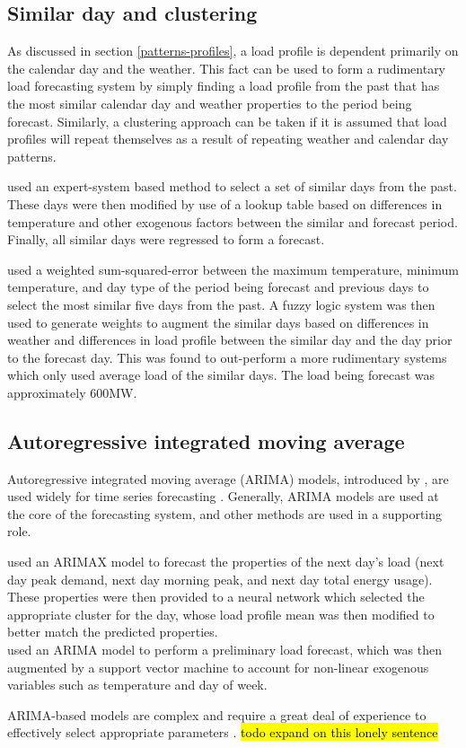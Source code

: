\subsection{Similar day and clustering}
As discussed in section \ref{patterns-profiles}, a load profile is dependent primarily on the calendar day and the weather.
This fact can be used to form a rudimentary load forecasting system by simply finding a load profile from the past that has the most similar calendar day and weather properties to the period being forecast. 
Similarly, a clustering approach can be taken if it is assumed that load profiles will repeat themselves as a result of repeating weather and calendar day patterns.
\par
\citet{Rahman1993} used an expert-system based method to select a set of similar days from the past. 
These days were then modified by use of a lookup table based on differences in temperature and other exogenous factors between the similar and forecast period.
Finally, all similar days were regressed to form a forecast.
\par
\citet{Senjyu1998} used a weighted sum-squared-error between the maximum temperature, minimum temperature, and day type of the period being forecast and previous days to select the most similar five days from the past.
A fuzzy logic system was then used to generate weights to augment the similar days based on differences in weather and differences in load profile between the similar day and the day prior to the forecast day.
This was found to out-perform a more rudimentary systems which only used average load of the similar days.
The load being forecast was approximately 600MW.
\par
{}


\subsection{Autoregressive integrated moving average}
Autoregressive integrated moving average (ARIMA) models, introduced by \citet{Box1970}, are used widely for time series forecasting \citep{Weron2006}. 
Generally, ARIMA models are used at the core of the forecasting system, and other methods are used in a supporting role. 
\par
\citet{Bennett2014} used an ARIMAX model to forecast the properties of the next day's load (next day peak demand, next day morning peak, and next day total energy usage). These properties were then provided to a neural network which selected the appropriate cluster for the day, whose load profile mean was then modified to better match the predicted properties.
\\
\citet{Karthika2017} used an ARIMA model to perform a preliminary load forecast, which was then augmented by a support vector machine to account for non-linear exogenous variables such as temperature and day of week.
\par
ARIMA-based models are complex and require a great deal of experience to effectively select appropriate parameters \citep{Desouky2000}.
\hl{todo expand on this lonely sentence}

